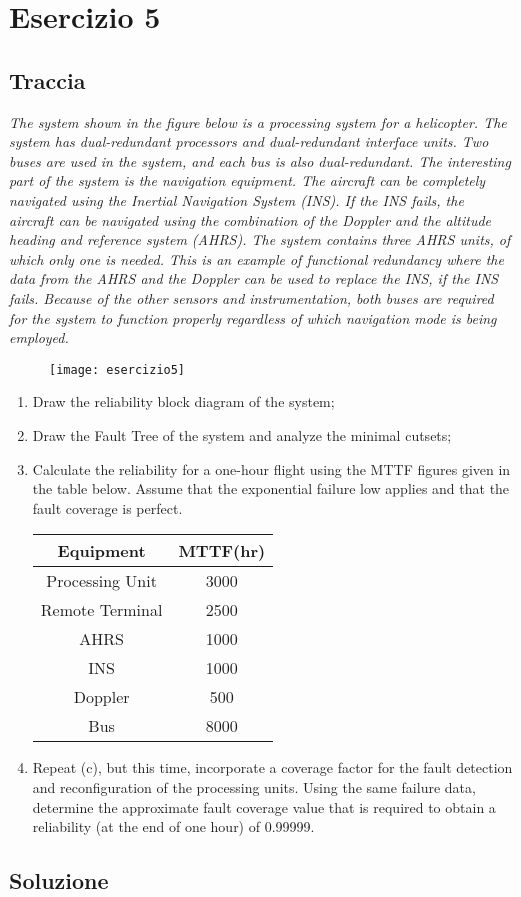 \clearpage
\section{Esercizio 5}
\subsection{Traccia}
\textit{The system shown in the figure below is a processing system for a helicopter. The system
has dual-redundant processors and dual-redundant interface units. Two buses are used in
the system, and each bus is also dual-redundant. The interesting part of the system is the
navigation equipment. The aircraft can be completely navigated using the Inertial
Navigation System (INS). If the INS fails, the aircraft can be navigated using the
combination of the Doppler and the altitude heading and reference system (AHRS). The
system contains three AHRS units, of which only one is needed. This is an example of
functional redundancy where the data from the AHRS and the Doppler can be used to
replace the INS, if the INS fails. Because of the other sensors and instrumentation, both
buses are required for the system to function properly regardless of which navigation mode
is being employed.}

\begin{figure}[!htbp]
  \centering
  \texttt{[image: esercizio5]}
\end{figure}

\begin{enumerate}
  \item Draw the reliability block diagram of the system;
  \item Draw the Fault Tree of the system and analyze the minimal cutsets;
  \item Calculate the reliability for a one-hour flight using the MTTF figures given in the table
  below. Assume that the exponential failure low applies and that the fault coverage is perfect.

  \begin{center}
  \begin{tabular}{|c|c|}
  	\hline
  	\textbf{Equipment} & \textbf{MTTF(hr)} \\
  	\hline
  	Processing Unit  & 3000 \\
  	\hline
  	Remote Terminal  & 2500 \\
  	\hline
  	AHRS & 1000 \\
  	\hline
  	INS & 1000 \\
  	\hline
  	Doppler & 500 \\
  	\hline
  	Bus & 8000 \\
  	\hline
  \end{tabular}
  \end{center}

  \item Repeat (c), but this time, incorporate a coverage factor for the fault
  detection and reconfiguration of the processing units. Using the same failure
  data, determine the approximate fault coverage value that is required to obtain
  a reliability (at the end of one hour) of 0.99999.
\end{enumerate}

\clearpage
\subsection{Soluzione}
